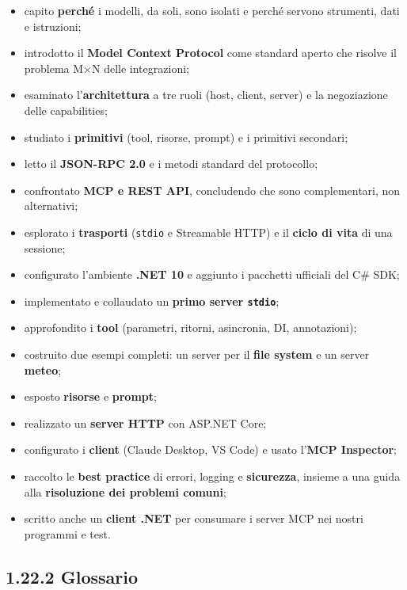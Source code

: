 \documentclass[
  italian,
  10pt,
]{book}
\providecommand{\tightlist}{%
  \setlength{\itemsep}{0pt}\setlength{\parskip}{0pt}}
\begin{document}
\begin{itemize}
\tightlist
\item
  capito \textbf{perché} i modelli, da soli, sono isolati e perché
  servono strumenti, dati e istruzioni;
\item
  introdotto il \textbf{Model Context Protocol} come standard aperto che
  risolve il problema M×N delle integrazioni;
\item
  esaminato l'\textbf{architettura} a tre ruoli (host, client, server) e
  la negoziazione delle capabilities;
\item
  studiato i \textbf{primitivi} (tool, risorse, prompt) e i primitivi
  secondari;
\item
  letto il \textbf{JSON-RPC 2.0} e i metodi standard del protocollo;
\item
  confrontato \textbf{MCP e REST API}, concludendo che sono
  complementari, non alternativi;
\item
  esplorato i \textbf{trasporti} (\texttt{stdio} e Streamable HTTP) e il
  \textbf{ciclo di vita} di una sessione;
\item
  configurato l'ambiente \textbf{.NET 10} e aggiunto i pacchetti
  ufficiali del C\# SDK;
\item
  implementato e collaudato un \textbf{primo server \texttt{stdio}};
\item
  approfondito i \textbf{tool} (parametri, ritorni, asincronia, DI,
  annotazioni);
\item
  costruito due esempi completi: un server per il \textbf{file system} e
  un server \textbf{meteo};
\item
  esposto \textbf{risorse} e \textbf{prompt};
\item
  realizzato un \textbf{server HTTP} con ASP.NET Core;
\item
  configurato i \textbf{client} (Claude Desktop, VS Code) e usato
  l'\textbf{MCP Inspector};
\item
  raccolto le \textbf{best practice} di errori, logging e
  \textbf{sicurezza}, insieme a una guida alla \textbf{risoluzione dei
  problemi comuni};
\item
  scritto anche un \textbf{client .NET} per consumare i server MCP nei
  nostri programmi e test.
\end{itemize}

\subsection{1.22.2 Glossario}\label{glossario}
\end{document}
